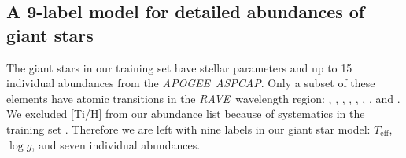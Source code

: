 \documentclass[preprint,trackchanges]{aastex}
\newcommand{\acronym}[1]{{\small{#1}}}
\newcommand{\project}[1]{\textsl{#1}}
\newcommand{\rave}{\project{\acronym{RAVE}}}
\newcommand{\apogee}{\project{\acronym{APOGEE}}}
\newcommand{\aspcap}{\project{\acronym{ASPCAP}}}
\newcommand{\teff}{T_{\mathrm{eff}}}
\newcommand{\logg}{\log g}
\begin{document}


\subsection{A 9-label model for detailed abundances of giant stars}
\label{sec:giant-abundance-model}

The giant stars in our training set have stellar parameters and up to 15 
individual abundances from the \apogee\ \aspcap.  Only a subset of these
elements have atomic transitions in the \rave\ wavelength region: 
, , , , , , 
, and .  We excluded [Ti/H] from our abundance list 
because of systematics in the training set \citep{Holtzman_2015,Hawkins_2016}.
Therefore we are left with nine labels in our giant star model: $\teff$, 
$\logg$, and seven individual abundances.  


\end{document}
